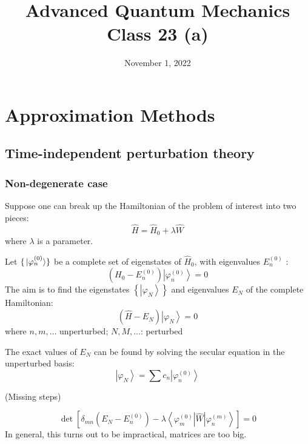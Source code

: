 \documentclass[12pt]{article}
\title{Advanced Quantum Mechanics\\Class 23 (a)}
\date{November 1, 2022}                                           %
\newcommand{\be}{\begin{equation}}
\newcommand{\ee}{\end{equation}}
\begin{document}
\maketitle

\section{Approximation Methods}

\subsection{Time-independent perturbation theory}

\subsubsection{Non-degenerate case}

Suppose one can break up the Hamiltonian of the
problem of interest into two pieces:
\be
\hat{H}=\hat{H}_{0}+\lambda \hat{W}
\ee
where $\lambda$ is a parameter.


Let $\{\ket*{\varphi_{n}^{(0)}}\}$ be a complete set of eigenstates of $\hat{H}_{0}$,
with eigenvalues $E_{n}^{(0)}$ :
\be
\left(H_{0}-E_{n}^{(0)}\right)\left|\varphi_{n}^{(0)}\right\rangle= 0
\ee
The aim is to find the eigenstates $\left\{\left|\varphi_{N}\right\rangle\right\}$ and eigenvalues
$E_{N}$ of the complete Hamiltonian:
\be
\left(\hat{H}-E_{N}\right)\left|\varphi_{N}\right\rangle=0
\label{eq:g3}
\ee
where $n,m,\ldots$ unperturbed; $N,M,\ldots$: perturbed

The exact values of $E_{N}$ can be found by solving
the secular equation in the unperturbed basis:
\be
\left|\varphi_{N}\right\rangle=\sum c_{n}\left|\varphi_{n}^{(0)}\right\rangle
\ee

(Missing steps)
\setcounter{equation}{6}

\be
\operatorname{det}\left[\delta_{mn}\left(E_{N}-E_{n}^{(0)}\right)-\lambda\left\langle\varphi_{m}^{(0)}|\hat{W}|\varphi_{n}^{(m)}\right\rangle\right]=0
\ee
In general, this turns out to be impractical, matrices are too big.

\end{document}
